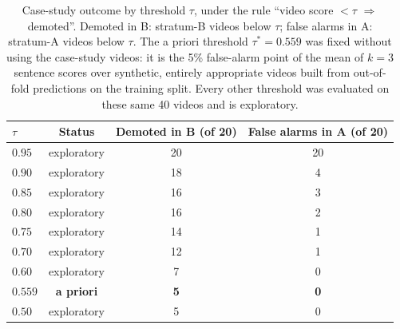 \begin{table}[!t]
\centering
\caption{Case-study outcome by threshold $\tau$, under the rule ``video score $< \tau$ $\Rightarrow$ demoted''. Demoted in B: stratum-B videos below $\tau$; false alarms in A: stratum-A videos below $\tau$. The a priori threshold $\tau^{*} = 0.559$ was fixed without using the case-study videos: it is the 5\% false-alarm point of the mean of $k = 3$ sentence scores over synthetic, entirely appropriate videos built from out-of-fold predictions on the training split. Every other threshold was evaluated on these same 40 videos and is exploratory.}
\label{tab:limiares-estudo-caso}
\begin{tabular}{lccc}
\toprule
$\tau$ & Status & Demoted in B (of 20) & False alarms in A (of 20) \\
\midrule
$0.95$ & exploratory & 20 & 20 \\
$0.90$ & exploratory & 18 & 4 \\
$0.85$ & exploratory & 16 & 3 \\
$0.80$ & exploratory & 16 & 2 \\
$0.75$ & exploratory & 14 & 1 \\
$0.70$ & exploratory & 12 & 1 \\
$0.60$ & exploratory & 7 & 0 \\
\textbf{$0.559$} & \textbf{a priori} & \textbf{5} & \textbf{0} \\
$0.50$ & exploratory & 5 & 0 \\
\bottomrule
\end{tabular}
\end{table}
